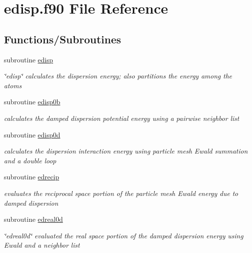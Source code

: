 \hypertarget{edisp_8f90}{\section{edisp.\-f90 File Reference}
\label{edisp_8f90}
}
\subsection*{Functions/\-Subroutines}
\begin{DoxyCompactItemize}
\item 
subroutine \hyperlink{edisp_8f90_a60070c5442af727eca7b351275d3e3d0}{edisp}
\begin{DoxyCompactList}\small\item\em \char`\"{}edisp\char`\"{} calculates the dispersion energy; also partitions the energy among the atoms \end{DoxyCompactList}\item 
subroutine \hyperlink{edisp_8f90_a45f7cbb71d61111c623f67ee14e6f7a1}{edisp0b}
\begin{DoxyCompactList}\small\item\em calculates the damped dispersion potential energy using a pairwise neighbor list \end{DoxyCompactList}\item 
subroutine \hyperlink{edisp_8f90_afd134ef30ac904bef54889aaacf40ec4}{edisp0d}
\begin{DoxyCompactList}\small\item\em calculates the dispersion interaction energy using particle mesh Ewald summation and a double loop \end{DoxyCompactList}\item 
subroutine \hyperlink{edisp_8f90_a3907858fd149d29843d7ebb7a8817ed8}{edrecip}
\begin{DoxyCompactList}\small\item\em evaluates the reciprocal space portion of the particle mesh Ewald energy due to damped dispersion \end{DoxyCompactList}\item 
subroutine \hyperlink{edisp_8f90_aba41eabe423af5968162589bb51a5f6f}{edreal0d}
\begin{DoxyCompactList}\small\item\em \char`\"{}edreal0d\char`\"{} evaluated the real space portion of the damped dispersion energy using Ewald and a neighbor list \end{DoxyCompactList}\end{DoxyCompactItemize}



